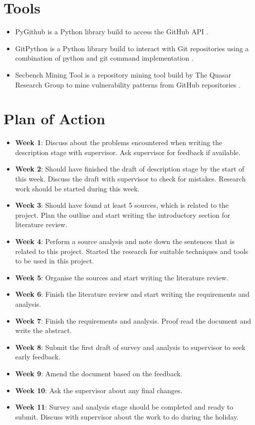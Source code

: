 \documentclass[12pt, a4paper]{report}
\begin{document}
\section{Tools}
\begin{itemize}
	\item PyGithub is a Python library build to access the GitHub API \cite{pygithub}.
	\item GitPython is a Python library build to interact with Git repositories using a combination of python and git command implementation \cite{gitpython}.
	\item Secbench Mining Tool is a repository mining tool build by The Quasar Research Group to mine vulnerability patterns from GitHub repositories \cite{secbench}.
\end{itemize}

\section{Plan of Action}
\begin{itemize}
	\item \textbf{Week 1}: Discuss about the problems encountered when writing the description stage with supervisor. Ask supervisor for feedback if available.
	\item \textbf{Week 2}: Should have finished the draft of description stage by the start of this week. Discuss the draft with supervisor to check for mistakes. Research work should be started during this week.
	\item \textbf{Week 3}: Should have found at least 5 sources, which is related to the project. Plan the outline and start writing the introductory section for literature review.
	\item \textbf{Week 4}: Perform a source analysis and note down the sentences that is related to this project. Started the research for suitable techniques and tools to be used in this project.
	\item \textbf{Week 5}: Organise the sources and start writing the literature review.
	\item \textbf{Week 6}: Finish the literature review and start writing the requirements and analysis.
	\item \textbf{Week 7}: Finish the requirements and analysis. Proof read the document and write the abstract.
	\item \textbf{Week 8}: Submit the first draft of survey and analysis to supervisor to seek early feedback.
	\item \textbf{Week 9}: Amend the document based on the feedback.
	\item \textbf{Week 10}: Ask the supervisor about any final changes.
	\item \textbf{Week 11}: Survey and analysis stage should be completed and ready to submit. Discuss with supervisor about the work to do during the holiday.
\end{itemize}
\end{document}

